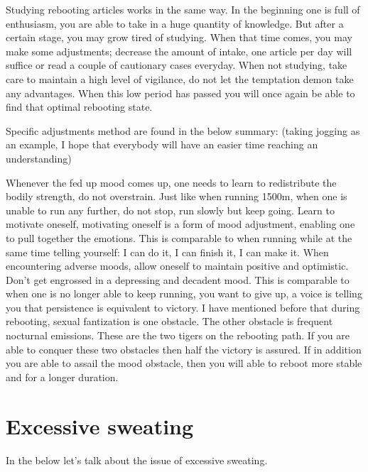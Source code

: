 \documentclass[
]{book}
\begin{document}
Studying rebooting articles works in the same way. In the beginning one is full of enthusiasm, you are able to take in a huge quantity of knowledge. But after a certain stage, you may grow tired of studying. When that time comes, you may make some adjustments; decrease the amount of intake, one article per day will suffice or read a couple of cautionary cases everyday. When not studying, take care to maintain a high level of vigilance, do not let the temptation demon take any advantages. When this low period has passed you will once again be able to find that optimal rebooting state.

Specific adjustments method are found in the below summary: (taking jogging as an example, I hope that everybody will have an easier time reaching an understanding)

Whenever the fed up mood comes up, one needs to learn to redistribute the bodily strength, do not overstrain. Just like when running 1500m, when one is unable to run any further, do not stop, run slowly but keep going.
Learn to motivate oneself, motivating oneself is a form of mood adjustment, enabling one to pull together the emotions. This is comparable to when running while at the same time telling yourself: I can do it, I can finish it, I can make it.
When encountering adverse moods, allow oneself to maintain positive and optimistic. Don't get engrossed in a depressing and decadent mood. This is comparable to when one is no longer able to keep running, you want to give up, a voice is telling you that persistence is equivalent to victory.
I have mentioned before that during rebooting, sexual fantization is one obstacle. The other obstacle is frequent nocturnal emissions. These are the two tigers on the rebooting path. If you are able to conquer these two obstacles then half the victory is assured. If in addition you are able to assail the mood obstacle, then you will able to reboot more stable and for a longer duration.

\hypertarget{excessive-sweating}{%
\section{Excessive sweating}\label{excessive-sweating}}

In the below let's talk about the issue of excessive sweating.
\end{document}
